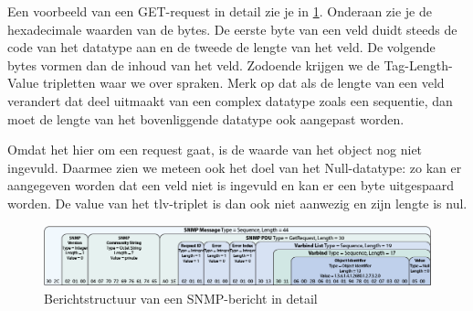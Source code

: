 Een voorbeeld van een GET-request in detail zie je in \cref{fig-berichtstructuur-3}.
Onderaan zie je de hexadecimale waarden van de bytes.
De eerste byte van een veld duidt steeds de code van het datatype aan en de tweede de lengte van het veld.
De volgende bytes vormen dan de inhoud van het veld.
Zodoende krijgen we de Tag-Length-Value tripletten waar we over spraken.
Merk op dat als de lengte van een veld verandert dat deel uitmaakt van een complex datatype zoals een sequentie,
dan moet de lengte van het bovenliggende datatype ook aangepast worden.

Omdat het hier om een request gaat, is de waarde van het object nog niet ingevuld.
Daarmee zien we meteen ook het doel van het Null-datatype: zo kan er aangegeven worden dat een veld niet is ingevuld en kan er een byte uitgespaard worden.
De value van het \gls{tlv}-triplet is dan ook niet aanwezig en zijn lengte is nul.

\begin{figure}[h]
	\centering
	\includegraphics[scale=0.40]{figures/snmp/berichtstructuur-3}
	\caption{Berichtstructuur van een SNMP-bericht in detail}
	\label{fig-berichtstructuur-3}
\end{figure}

